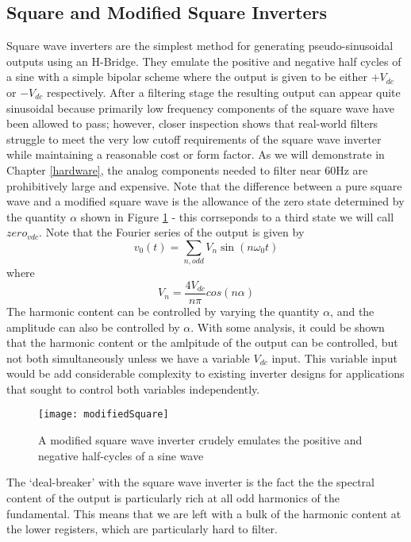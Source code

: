 \subsection{Square and Modified Square Inverters}
\label{squareApproach}
Square wave inverters are the simplest method for generating pseudo-sinusoidal outputs using an H-Bridge. They emulate the positive and negative half cycles of a sine with a simple bipolar scheme where the output is given to be either $+V_{dc}$ or $-V_{dc}$ respectively. After a filtering stage the resulting output can appear quite sinusoidal because primarily low frequency components of the square wave have been allowed to pass; however, closer inspection shows that real-world filters struggle to meet the very low cutoff requirements of the square wave inverter while maintaining a reasonable cost or form factor. As we will demonstrate in Chapter \ref{hardware}, the analog components needed to filter near 60Hz are prohibitively large and expensive. Note that the difference between a pure square wave and a modified square wave is the allowance of the zero state determined by the quantity $\alpha$ shown in Figure \ref{modifiedSquare} - this corrseponds to a third state we will call $zero_{vdc}$. Note that the Fourier series of the output is given by 
\begin{equation}
v_0(t)=\sum\limits_{n,odd}V_n\sin{(n\omega_0t)}
\end{equation}
where 
\begin{equation}
V_n=\frac{4V_{dc}}{n\pi}cos{(n\alpha)}
\end{equation}
The harmonic content can be controlled by varying the quantity $\alpha$, and the amplitude can also be controlled by $\alpha$. With some analysis, it could be shown that the harmonic content or the amlpitude of the output can be controlled, but not both simultaneously unless we have a variable $V_{dc}$ input. This variable input would be add considerable complexity to existing inverter designs for applications that sought to control both variables independently.

\begin{figure}[h]
\centering
\texttt{[image: modifiedSquare]}
\caption{A modified square wave inverter crudely emulates the positive and negative half-cycles of a sine wave \cite{inverterFourier}}
\label{modifiedSquare}
\end{figure}

The `deal-breaker' with the square wave inverter is the fact the the spectral content of the output is particularly rich at all odd harmonics of the fundamental. This means that we are left with a bulk of the harmonic content at the lower registers, which are particularly hard to filter. 

